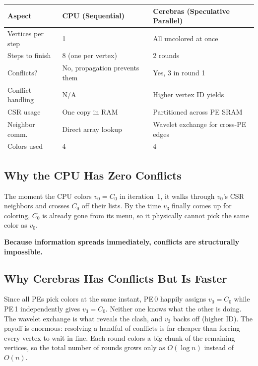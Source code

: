 \documentclass[11pt,letterpaper]{article}
\begin{document}
\begin{center}
\renewcommand{\arraystretch}{1.3}
\begin{tabular}{>{\raggedright}p{3.2cm} p{4.8cm} p{4.8cm}}
\toprule
\textbf{Aspect} & \textbf{CPU (Sequential)} & \textbf{Cerebras (Speculative Parallel)} \\
\midrule
Vertices per step & 1 & All uncolored at once \\
Steps to finish & 8 (one per vertex) & 2 rounds \\
Conflicts? & No, propagation prevents them & Yes, 3 in round 1 \\
Conflict handling & N/A & Higher vertex ID yields \\
CSR usage & One copy in RAM & Partitioned across PE SRAM \\
Neighbor comm. & Direct array lookup & Wavelet exchange for cross-PE edges \\
Colors used & 4 & 4 \\
\bottomrule
\end{tabular}
\end{center}

\subsection{Why the CPU Has Zero Conflicts}

The moment the CPU colors $v_0 = C_0$ in iteration~1, it walks through $v_0$'s CSR neighbors and crosses $C_0$ off their lists. By the time $v_3$ finally comes up for coloring, $C_0$ is already gone from its menu, so it physically cannot pick the same color as $v_0$.

\textbf{Because information spreads immediately, conflicts are structurally impossible.}

\subsection{Why Cerebras Has Conflicts But Is Faster}

Since all PEs pick colors at the same instant, PE\,0 happily assigns $v_0{=}C_0$ while PE\,1 independently gives $v_3{=}C_0$. Neither one knows what the other is doing. The wavelet exchange is what reveals the clash, and $v_3$ backs off (higher ID). The payoff is enormous: resolving a handful of conflicts is far cheaper than forcing every vertex to wait in line. Each round colors a big chunk of the remaining vertices, so the total number of rounds grows only as $O(\log n)$ instead of $O(n)$.
\end{document}
